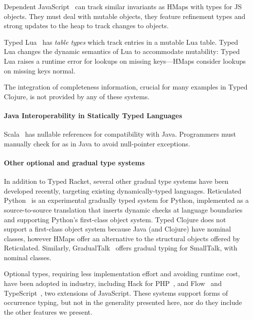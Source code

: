 Dependent JavaScript~\cite{Chugh:2012:DTJ} can track similar
invariants as HMaps with types for JS objects. They must deal with
mutable objects, they feature refinement types and strong updates to
the heap to track changes to objects.

Typed Lua~\cite{Maidl:2014:TLO} has \emph{table types} which track
entries in a mutable Lua table.  Typed Lua changes the dynamic
semantics of Lua to accommodate mutability: Typed Lua raises a runtime
error for lookups on missing keys---HMaps consider lookups on missing
keys normal.

The integration of completeness information, crucial for many examples
in Typed Clojure, is not provided by any of these systems.

\paragraph{Java Interoperability in Statically Typed Languages}
Scala~\cite{OCD+} has nullable references for compatibility with Java.
Programmers must manually check for
 as in Java to avoid null-pointer exceptions. 


\paragraph{Other optional and gradual type systems}
In addition to Typed Racket, several other gradual type
systems have been developed recently, targeting existing
dynamically-typed languages.  Reticulated Python~\cite{Vitousek14} is
an experimental gradually typed system for Python, implemented as a
source-to-source translation that inserts dynamic checks at language
boundaries and supporting Python's first-class object system.  Typed
Clojure does not support a first-class object system because Java (and
Clojure) have nominal classes, however HMaps offer an alternative to
the structural objects offered by Reticulated. Similarly,
GradualTalk~\cite{gradualtalk} offers gradual typing for SmallTalk,
with nominal classes.

Optional types, requiring less implementation effort and avoiding
runtime cost, have been  adopted in industry, including Hack for PHP~\cite{hack}, and Flow~\cite{flow} and
TypeScript~\cite{typescript}, two extensions of JavaScript. These
systems  support  forms of occurrence typing, but not in the
generality presented here, nor do they include the other features we
present.



